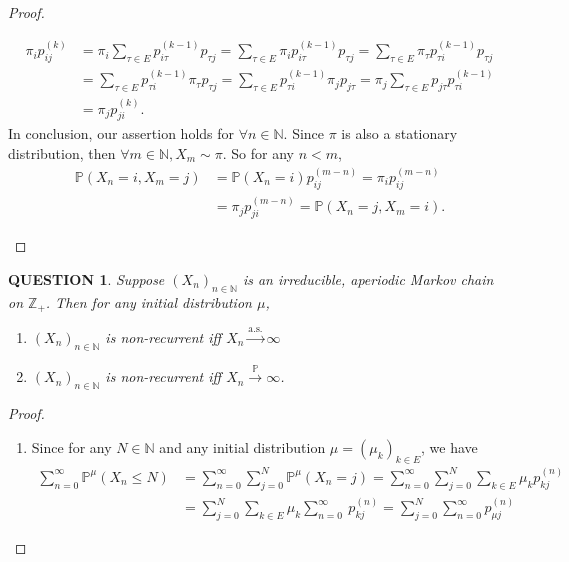 \documentclass[12pt]{article}
\renewcommand{\(}{\left(}%
\renewcommand{\)}{\right)}%
\renewcommand{\[}{\left[}%
\renewcommand{\]}{\right]}%
\renewcommand{\ae}{\mathrm{a.s.}}
\newcommand{\z}{\mathbb{Z}}
\newcommand{\p}{\mathbb{P}}
\newcommand{\n}{\mathbb{N}}
\newtheorem{question}{QUESTION}[section]}
\newtheorem{proof}{Proof.}}
\begin{document}
\begin{proof}
\begin{enumerate}
\begin{equation*}
    \begin{split}
     \pi_ip_{ij}^{(k)}&=\pi_i\sum_{\tau\in E}p_{i\tau}^{(k-1)}p_{\tau j} =\sum_{\tau\in E}\pi_ip_{i\tau}^{(k-1)}p_{\tau j}=\sum_{\tau\in E}\pi_\tau p_{\tau i}^{(k-1)}p_{\tau j}\\
     &=\sum_{\tau\in E} p_{\tau i}^{(k-1)}\pi_\tau p_{\tau j}=\sum_{\tau\in E} p_{\tau i}^{(k-1)}\pi_j p_{j\tau}=\pi_j \sum_{\tau\in E} p_{j\tau}p_{\tau i}^{(k-1)}\\
     &=\pi_jp_{ji}^{(k)}.
    \end{split}
   \end{equation*}
    In conclusion, our assertion holds for $\forall n\in\n$.
   Since $\pi$ is also a stationary distribution, then $\forall m\in\n, X_m\sim\pi$. So for any $n<m$,
   \begin{equation*}
    \begin{split}
    	\p(X_n=i,X_m=j)&=\p(X_n=i)p_{ij}^{(m-n)}=\pi_i p_{ij}^{(m-n)} \\
    	&=\pi_j p_{ji}^{(m-n)}=\p(X_n=j,X_m=i).
    \end{split}  
   \end{equation*}
  \end{enumerate}
 \end{proof}
  
  \begin{question}
  	Suppose $(X_n)_{n\in\n}$ is an irreducible, aperiodic Markov chain on $\z_+$. Then for any initial distribution $\mu$,
  	\begin{enumerate}
  		\item $(X_n)_{n\in\n}$ is non-recurrent iff $X_n\overset{\ae}{\to}\infty$ 
  		\item $(X_n)_{n\in\n}$ is non-recurrent iff $X_n\overset{\p}{\to}\infty$.
  	\end{enumerate}
  \end{question}
  \begin{proof}
  	\begin{enumerate}
  		\item Since for any $N\in\n$ and any initial distribution $\mu=(\mu_k)_{k\in E}$, we have
  		\begin{equation*}
  			\begin{split}
  				\sum_{n=0}^\infty\p^{\mu}(X_n\leq N)&=\sum_{n=0}^\infty\sum_{j=0}^N \p^\mu(X_n= j)=\sum_{n=0}^\infty\sum_{j=0}^N\sum_{k\in E} \mu_kp_{k j}^{(n)}\\
  				&=\sum_{j=0}^N\sum_{k\in E}\mu_k\sum_{n=0}^\infty\ p_{k j}^{(n)}=\sum_{j=0}^N\sum_{n=0}^\infty p_{\mu j}^{(n)}
  			\end{split}
  		\end{equation*}
  	\end{enumerate}
  \end{proof}
  
\end{document}
